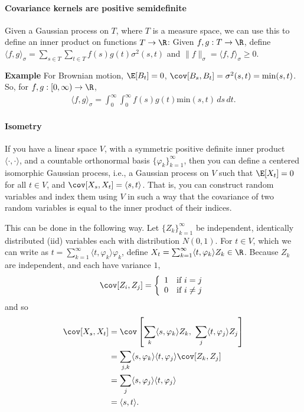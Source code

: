 \paragraph{Covariance kernels are positive semidefinite}
        Given a Gaussian process on $T$, where $T$ is a measure space, 
        we can use this to define an inner product on functions $T\to\R$:
        Given $f,g:T\to \R$, define $\langle f,g\rangle_{\sigma}=\sum_{s\in T}\sum_{t\in T}f(s)g(t)\sigma^2(s,t)$ 
        and $\|f\|_\sigma=\langle f,f\rangle_\sigma\geq 0$.

\textbf{Example} 
    For Brownian motion, $\E[B_t]=0$, $\cov[B_s,B_t]=\sigma^2(s,t)=\mathrm{min}(s,t)$.  
    So, for $f,g:[0,\infty)\to\R$, 
    $$\begin{aligned}
        \langle f,g\rangle_\sigma=\int_0^\infty\int_0^\infty f(s)g(t)\mathrm{min}(s,t)\,ds\,dt.
    \end{aligned}$$


\paragraph{Isometry} 
    If you have a linear space $V$, 
        with a symmetric positive definite inner product $\langle\cdot,\cdot \rangle$, 
        and a countable orthonormal basis $\{\varphi_k\}_{k=1}^{\infty}$, 
        then you can define a centered isomorphic Gaussian process, 
        i.e., a Gaussian process on $V$ such that $\E[X_t]=0$ for all $t\in V$, and $\cov[X_s,X_t]=\langle s,t\rangle$.  
        That is, you can construct random variables and index them using $V$ in such a way that the covariance of two random variables is equal to the inner product of their indices.

        This can be done in the following way.  
        Let $\{Z_k\}_{k=1}^\infty$ be independent, identically distributed (iid) variables each with distribution $N(0,1)$.  
        For $t\in V$, which we can write as $t=\sum_{k=1}^\infty \langle t,\varphi_k\rangle \varphi_k$, define $X_t=\sum_{k=1}^\infty \langle t,\varphi_k\rangle Z_k\in\R$.  
        Because $Z_k$ are independent, and each have variance $1$, 
        $$\begin{aligned}
            \cov[Z_i,Z_j]=\left\{\begin{array}{cc}
            1 & \text{if }i=j\\
            0 & \text{if }i\neq j\\
            \end{array}\right.
        \end{aligned}$$
        and so 
        $$\begin{aligned}
            \cov[X_s,X_t]
                &=\cov\left[\sum_k\langle s,\varphi_k\rangle Z_k,\,\,\sum_j\langle t,\varphi_j\rangle Z_j\right]\\
                &=\sum_{j,k}\langle s,\varphi_k\rangle \langle t,\varphi_j\rangle \cov[Z_k,Z_j]\\
                &=\sum_j\langle s,\varphi_j\rangle \langle t,\varphi_j\rangle\\
                &=\langle s,t\rangle.
        \end{aligned}$$

